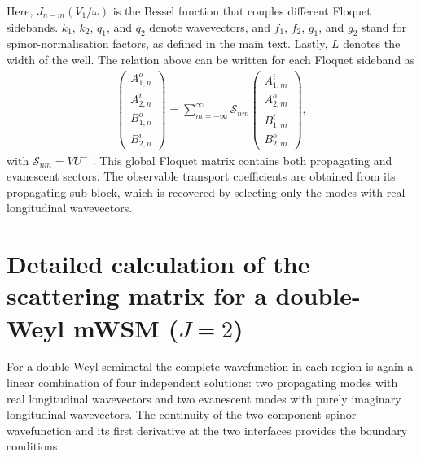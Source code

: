 \documentclass[aps,prb,onecolumn,longbibliography,nofootinbib,citeautoscript,10pt]{revtex4-2}
\begin{document}
Here, $J_{n-m}(V_1/\omega)$ is the Bessel function that couples different Floquet sidebands. $k_1$, $k_2$, $q_1$, and $ q_2$ denote wavevectors, and $f_1$, $ f_2$, $ g_1$, and $ g_2$ stand for spinor-normalisation factors, as defined in the main text. Lastly, $L$ denotes the width of the well.
The relation above can be written for each Floquet sideband as
\begin{align}
\begin{pmatrix}
A_{1,n}^{o}\\
A_{2,n}^{i}\\
B_{1,n}^{o}\\
B_{2,n}^{i}
\end{pmatrix}
=
\sum_{m=-\infty}^{\infty}
\mathcal{S}_{nm}
\begin{pmatrix}
A_{1,m}^{i}\\
A_{2,m}^{o}\\
B_{1,m}^{i}\\
B_{2,m}^{o}
\end{pmatrix} , 
\end{align}
with $\mathcal{S}_{nm}=V U^{-1}$. This global Floquet matrix contains both propagating and evanescent sectors. The observable transport coefficients are obtained from its propagating sub-block, which is recovered by selecting only the modes with real longitudinal wavevectors.


\section{Detailed calculation of the scattering matrix for a double-Weyl mWSM ($J=2$)}\label{appendiX_Weyl_j2}

For a double-Weyl semimetal the complete wavefunction in each region is again a linear combination of four independent solutions: two propagating modes with real longitudinal wavevectors and two evanescent modes with purely imaginary longitudinal wavevectors. The continuity of the two-component spinor wavefunction and its first derivative at the two interfaces provides the boundary conditions.
\end{document}
